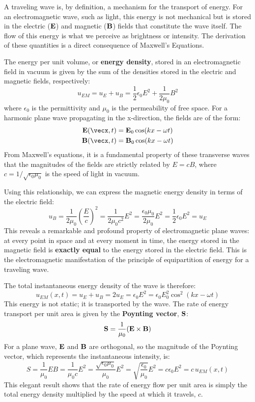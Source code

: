 \begin{proposition}
A traveling wave is, by definition, a mechanism for the transport of energy. For an electromagnetic wave, such as light, this energy is not mechanical but is stored in the electric ($\mathbf{E}$) and magnetic ($\mathbf{B}$) fields that constitute the wave itself. The flow of this energy is what we perceive as brightness or intensity. The derivation of these quantities is a direct consequence of Maxwell's Equations.

The energy per unit volume, or \textbf{energy density}, stored in an electromagnetic field in vacuum is given by the sum of the densities stored in the electric and magnetic fields, respectively:
$$ u_{EM} = u_E + u_B = \frac{1}{2}\epsilon_0 E^2 + \frac{1}{2\mu_0} B^2 $$
where $\epsilon_0$ is the permittivity and $\mu_0$ is the permeability of free space. For a harmonic plane wave propagating in the x-direction, the fields are of the form:
\begin{align*}
    \vecbf{E}(\vecx, t) &= \vecbf{E}_0 \cos(kx - \omega t) \\
    \vecbf{B}(\vecx, t) &= \vecbf{B}_0 \cos(kx - \omega t)
\end{align*}
From Maxwell's equations, it is a fundamental property of these transverse waves that the magnitudes of the fields are strictly related by $E = cB$, where $c = 1/\sqrt{\epsilon_0\mu_0}$ is the speed of light in vacuum.

Using this relationship, we can express the magnetic energy density in terms of the electric field:
$$ u_B = \frac{1}{2\mu_0} \left(\frac{E}{c}\right)^2 = \frac{1}{2\mu_0 c^2} E^2 = \frac{\epsilon_0\mu_0}{2\mu_0} E^2 = \frac{1}{2}\epsilon_0 E^2 = u_E $$
This reveals a remarkable and profound property of electromagnetic plane waves: at every point in space and at every moment in time, the energy stored in the magnetic field is \textbf{exactly equal} to the energy stored in the electric field. This is the electromagnetic manifestation of the principle of equipartition of energy for a traveling wave.

The total instantaneous energy density of the wave is therefore:
$$ u_{EM}(x,t) = u_E + u_B = 2u_E = \epsilon_0 E^2 = \epsilon_0 E_0^2 \cos^2(kx - \omega t) $$
This energy is not static; it is transported by the wave. The rate of energy transport per unit area is given by the \textbf{Poynting vector}, $\mathbf{S}$:
$$ \mathbf{S} = \frac{1}{\mu_0} (\mathbf{E} \times \mathbf{B}) $$
For a plane wave, $\mathbf{E}$ and $\mathbf{B}$ are orthogonal, so the magnitude of the Poynting vector, which represents the instantaneous intensity, is:
$$ S = \frac{1}{\mu_0} EB = \frac{1}{\mu_0c} E^2 = \frac{\sqrt{\epsilon_0\mu_0}}{\mu_0} E^2 = \sqrt{\frac{\epsilon_0}{\mu_0}} E^2 = c\epsilon_0 E^2 = c \, u_{EM}(x,t) $$
This elegant result shows that the rate of energy flow per unit area is simply the total energy density multiplied by the speed at which it travels, $c$.


\end{proposition}
